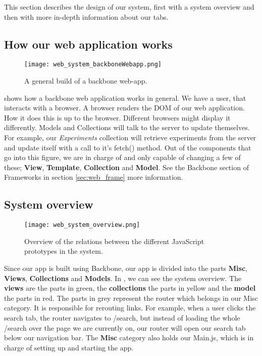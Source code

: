 This section describes the design of our system, first with a system overview
and then with more in-depth information about our tabs.
\subsection{How our web application works}
\begin{figure}[h]
\centering
\texttt{[image: web\_system\_backboneWebapp.png]}
\caption{\label{fig:web_system_backboneWebapp}A general build of a backbone web-app.}
\end{figure}

 shows how a backbone\cite{web_1} web application works in general. We have a user, that interacts with a browser. A browser renders the DOM of our web application. How it does this is up to the browser. Different browsers might display it differently. Models and Collections will talk to the server to update themselves. For example, our \textit{Experiments} collection will retrieve experiments from the server and update itself with a call to it’s fetch() method. Out of the components that go into this figure, we are in charge of and only capable of changing a few of these; \textbf{View}, \textbf{Template}, \textbf{Collection} and \textbf{Model}. See the Backbone section of Frameworks in section \ref{sec:web_frame} more information.

\subsection{System overview}
\begin{figure}[h]
\centering
\texttt{[image: web\_system\_overview.png]}
\caption{\label{fig:web_system_overview}Overview of the relations between the different JavaScript prototypes in the system.}
\end{figure}

Since our app is built using Backbone\cite{web_1}, our app is divided into the parts \textbf{Misc}, \textbf{Views}, \textbf{Collections} and \textbf{Models}. In , we can see the system overview. The \textbf{views} are the parts in green, the \textbf{collections} the parts in yellow and the \textbf{model} the parts in red. The parts in grey represent the router which belongs in our Misc category. It is responsible for rerouting links. For example, when a user clicks the search tab, the router navigates to /search, but instead of loading the whole /search over the page we are currently on, our router will open our search tab below our navigation bar. The \textbf{Misc} category also holds our Main.js, which is in charge of setting up and starting the app.


